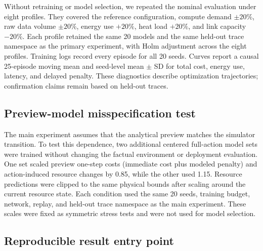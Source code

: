 \documentclass[11pt]{article}
\begin{document}
Without retraining or model selection, we repeated the nominal evaluation under eight profiles. They covered the reference configuration, compute demand $\pm20\%$, raw data volume $\pm20\%$, energy use $+20\%$, heat load $+20\%$, and link capacity $-20\%$. Each profile retained the same 20 models and the same held-out trace namespace as the primary experiment, with Holm adjustment across the eight profiles. Training logs record every episode for all 20 seeds. Curves report a causal 25-episode moving mean and seed-level mean $\pm$ SD for total cost, energy use, latency, and delayed penalty. These diagnostics describe optimization trajectories; confirmation claims remain based on held-out traces.

\subsection{Preview-model misspecification test}

The main experiment assumes that the analytical preview matches the simulator transition. To test this dependence, two additional centered full-action model sets were trained without changing the factual environment or deployment evaluation. One set scaled preview one-step costs (immediate cost plus modeled penalty) and action-induced resource changes by 0.85, while the other used 1.15. Resource predictions were clipped to the same physical bounds after scaling around the current resource state. Each condition used the same 20 seeds, training budget, network, replay, and held-out trace namespace as the main experiment. These scales were fixed as symmetric stress tests and were not used for model selection.

\subsection{Reproducible result entry point}
\end{document}
